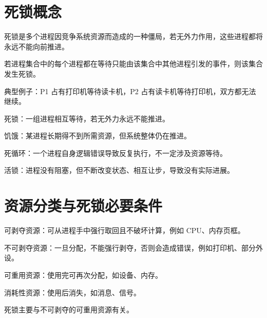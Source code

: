 
\section{死锁概念}
\begin{points}
  \item 死锁是多个进程因竞争系统资源而造成的一种僵局，若无外力作用，这些进程都将永远不能向前推进。
  \item 若进程集合中的每个进程都在等待只能由该集合中其他进程引发的事件，则该集合发生死锁。
  \item 典型例子：P1 占有打印机等待读卡机，P2 占有读卡机等待打印机，双方都无法继续。
\end{points}


\begin{points}
  \item 死锁：一组进程相互等待，若无外力永远不能推进。
  \item 饥饿：某进程长期得不到所需资源，但系统整体仍在推进。
  \item 死循环：一个进程自身逻辑错误导致反复执行，不一定涉及资源等待。
  \item 活锁：进程没有阻塞，但不断改变状态、相互让步，导致没有实际进展。
\end{points}


\section{资源分类与死锁必要条件}
\begin{points}
  \item 可剥夺资源：可从进程手中强行取回且不破坏计算，例如 CPU、内存页框。
  \item 不可剥夺资源：一旦分配，不能强行剥夺，否则会造成错误，例如打印机、部分外设。
  \item 可重用资源：使用完可再次分配，如设备、内存。
  \item 消耗性资源：使用后消失，如消息、信号。
  \item 死锁主要与不可剥夺的可重用资源有关。
\end{points}


